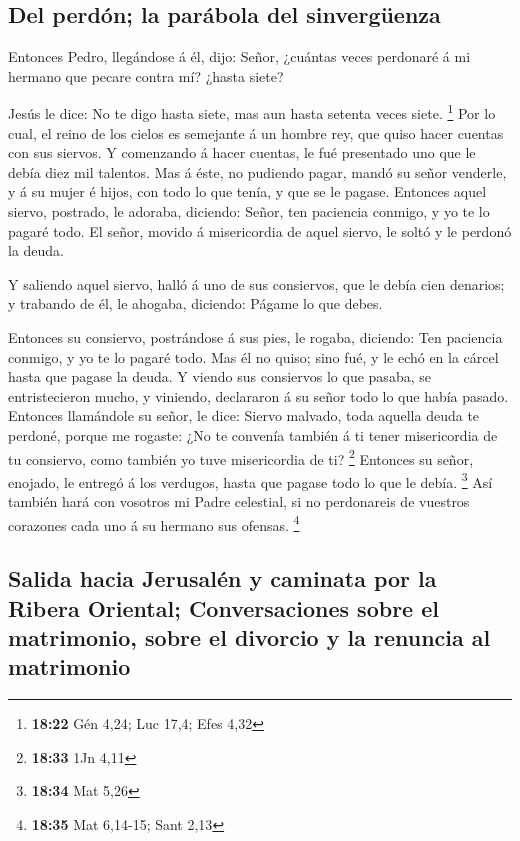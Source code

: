 \hypertarget{del-perduxf3n-la-paruxe1bola-del-sinverguxfcenza}{%
\subsection{Del perdón; la parábola del
sinvergüenza}\label{del-perduxf3n-la-paruxe1bola-del-sinverguxfcenza}}

 Entonces Pedro, llegándose á él, dijo: Señor, ¿cuántas
veces perdonaré á mi hermano que pecare contra mí? ¿hasta siete?

 Jesús le dice: No te digo hasta siete, mas aun hasta
setenta veces siete. \footnote{\textbf{18:22} Gén 4,24; Luc 17,4; Efes
  4,32}  Por lo cual, el reino de los cielos es semejante á
un hombre rey, que quiso hacer cuentas con sus siervos.  Y
comenzando á hacer cuentas, le fué presentado uno que le debía diez mil
talentos.  Mas á éste, no pudiendo pagar, mandó su señor
venderle, y á su mujer é hijos, con todo lo que tenía, y que se le
pagase.  Entonces aquel siervo, postrado, le adoraba,
diciendo: Señor, ten paciencia conmigo, y yo te lo pagaré todo.
 El señor, movido á misericordia de aquel siervo, le soltó
y le perdonó la deuda.

 Y saliendo aquel siervo, halló á uno de sus consiervos,
que le debía cien denarios; y trabando de él, le ahogaba, diciendo:
Págame lo que debes.

 Entonces su consiervo, postrándose á sus pies, le rogaba,
diciendo: Ten paciencia conmigo, y yo te lo pagaré todo. 
Mas él no quiso; sino fué, y le echó en la cárcel hasta que pagase la
deuda.  Y viendo sus consiervos lo que pasaba, se
entristecieron mucho, y viniendo, declararon á su señor todo lo que
había pasado.  Entonces llamándole su señor, le dice:
Siervo malvado, toda aquella deuda te perdoné, porque me rogaste:
 ¿No te convenía también á ti tener misericordia de tu
consiervo, como también yo tuve misericordia de ti? \footnote{\textbf{18:33}
  1Jn 4,11}  Entonces su señor, enojado, le entregó á los
verdugos, hasta que pagase todo lo que le debía. \footnote{\textbf{18:34}
  Mat 5,26}  Así también hará con vosotros mi Padre
celestial, si no perdonareis de vuestros corazones cada uno á su hermano
sus ofensas. \footnote{\textbf{18:35} Mat 6,14-15; Sant 2,13}

\hypertarget{salida-hacia-jerusaluxe9n-y-caminata-por-la-ribera-oriental-conversaciones-sobre-el-matrimonio-sobre-el-divorcio-y-la-renuncia-al-matrimonio}{%
\subsection{Salida hacia Jerusalén y caminata por la Ribera Oriental;
Conversaciones sobre el matrimonio, sobre el divorcio y la renuncia al
matrimonio}\label{salida-hacia-jerusaluxe9n-y-caminata-por-la-ribera-oriental-conversaciones-sobre-el-matrimonio-sobre-el-divorcio-y-la-renuncia-al-matrimonio}}

